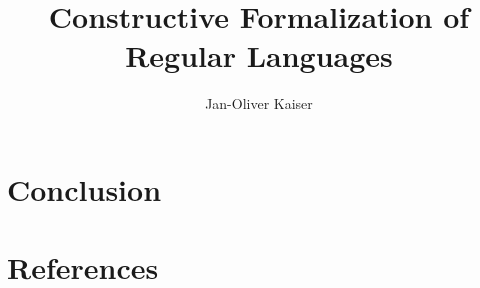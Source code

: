 \documentclass[11pt,a4paper,oneside]{book}
\title{Constructive Formalization of Regular Languages}
\author{Jan-Oliver Kaiser}
\begin{document}
    \maketitle
    
    

    \tableofcontents
    
    

    

    

    

    

    \chapter{Conclusion}

    \chapter{References}

    \nocite{*}

    {}
    
\end{document}
